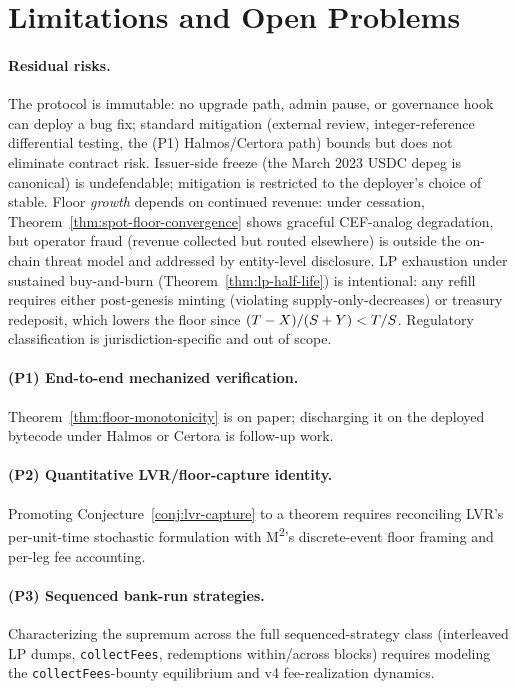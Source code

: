 \section{Limitations and Open Problems}
\label{sec:limitations}

\paragraph{Residual risks.} The protocol is immutable: no upgrade path, admin pause, or governance hook can deploy a bug fix; standard mitigation (external review, integer-reference differential testing, the (P1) Halmos/Certora path) bounds but does not eliminate contract risk. Issuer-side freeze (the March 2023 USDC depeg is canonical) is undefendable; mitigation is restricted to the deployer's choice of stable. Floor \emph{growth} depends on continued revenue: under cessation, Theorem~\ref{thm:spot-floor-convergence} shows graceful CEF-analog degradation, but operator fraud (revenue collected but routed elsewhere) is outside the on-chain threat model and addressed by entity-level disclosure. LP exhaustion under sustained buy-and-burn (Theorem~\ref{thm:lp-half-life}) is intentional: any refill requires either post-genesis minting (violating supply-only-decreases) or treasury redeposit, which lowers the floor since $(T - X)/(S + Y) < T/S$. Regulatory classification is jurisdiction-specific and out of scope.

\paragraph{(P1) End-to-end mechanized verification.} Theorem~\ref{thm:floor-monotonicity} is on paper; discharging it on the deployed bytecode under Halmos or Certora \citep{Tolmach2022} is follow-up work.

\paragraph{(P2) Quantitative LVR/floor-capture identity.} Promoting Conjecture~\ref{conj:lvr-capture} to a theorem requires reconciling LVR's per-unit-time stochastic formulation with M\textsuperscript{2}'s discrete-event floor framing and per-leg fee accounting.

\paragraph{(P3) Sequenced bank-run strategies.} Characterizing the supremum across the full sequenced-strategy class (interleaved LP dumps, \texttt{collectFees}, redemptions within/across blocks) requires modeling the \texttt{collectFees}-bounty equilibrium and v4 fee-realization dynamics.
